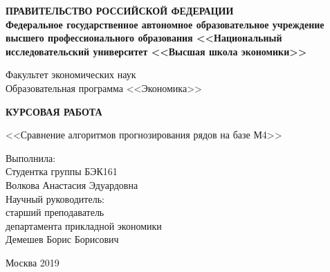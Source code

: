 \documentclass[a4paper,12pt]{article}
\theoremstyle{plain} %
\theoremstyle{definition} %
\theoremstyle{remark} %
\begin{document}

  \thispagestyle{empty}
  \begin{center}
      \textbf{ПРАВИТЕЛЬСТВО РОССИЙСКОЙ ФЕДЕРАЦИИ}\\
      \vspace{2ex}
      \textbf{Федеральное государственное автономное образовательное учреждение\\ высшего профессионального образования
<<Национальный\\ исследовательский университет  <<Высшая школа экономики>>}

      \vspace{8ex}
      \begin{center}
          Факультет экономических наук\\
          \vspace{4ex}
          Образовательная программа <<Экономика>>
      \end{center}
  \end{center}
  \vspace{9ex}

  \begin{center}
      {\textbf{КУРСОВАЯ РАБОТА
      }}
      \vspace{1ex}

      <<Сравнение алгоритмов прогнозирования рядов на базе М4>>
  \end{center}
  \vspace{8ex}
  \begin{flushright}
    \noindent
    Выполнила:\\
    \vspace{1ex}
      \noindent
      Студентка группы БЭК161\\
      Волкова Анастасия Эдуардовна\\
      \vspace{10ex}
      Научный руководитель:\\
      \vspace{1ex}
      старший преподаватель\\ департамента прикладной экономики\\
      Демешев Борис Борисович

  \end{flushright}

  \vfill

  \begin{center}
      Москва 2019

  \end{center}
  \newpage
\end{document}
